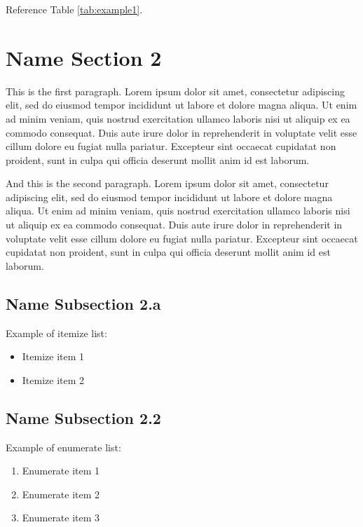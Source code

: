 \documentclass{llncs}
\begin{document}
Reference Table \ref{tab:example1}.



\section{Name Section 2}

This is the first paragraph. Lorem ipsum dolor sit amet, consectetur adipiscing elit, sed do eiusmod tempor incididunt ut labore et dolore magna aliqua. Ut enim ad minim veniam, quis nostrud exercitation ullamco laboris nisi ut aliquip ex ea commodo consequat. Duis aute irure dolor in reprehenderit in voluptate velit esse cillum dolore eu fugiat nulla pariatur. Excepteur sint occaecat cupidatat non proident, sunt in culpa qui officia deserunt mollit anim id est laborum.

And this is the second paragraph. Lorem ipsum dolor sit amet, consectetur adipiscing elit, sed do eiusmod tempor incididunt ut labore et dolore magna aliqua. Ut enim ad minim veniam, quis nostrud exercitation ullamco laboris nisi ut aliquip ex ea commodo consequat. Duis aute irure dolor in reprehenderit in voluptate velit esse cillum dolore eu fugiat nulla pariatur. Excepteur sint occaecat cupidatat non proident, sunt in culpa qui officia deserunt mollit anim id est laborum.



\subsection{Name Subsection 2.a}

Example of itemize list:


\begin{itemize}
  \item Itemize item 1
  \item Itemize item 2
\end{itemize}



\subsection{Name Subsection 2.2}

Example of enumerate list:

\begin{enumerate}
  \item Enumerate item 1
  \item Enumerate item 2
  \item Enumerate item 3
\end{enumerate}
\end{document}
